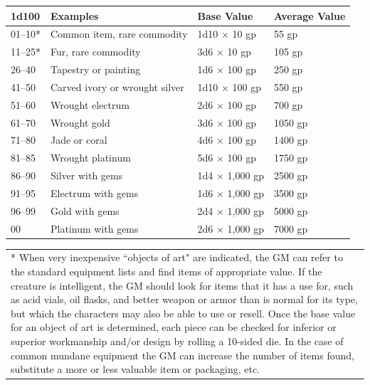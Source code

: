 \begin{multicols}{2}
\begin{minipage}{\columnwidth}
\label{artobjects}
\noindent
\begin{tabular}{|p{}|p{}|p{}|p{}|}
\hline
1d100	& Examples	& Base Value	& Average Value \\
\hline\hline
\rowcolor[gray]{.9}01--10*	& Common item, rare commodity	& 1d10 $\times$ 10 gp	& 55 gp \\
11--25*	& Fur, rare commodity	& 3d6 $\times$ 10 gp	& 105 gp \\
\rowcolor[gray]{.9}26--40	& Tapestry or painting	& 1d6 $\times$ 100 gp	& 250 gp \\
41--50	& Carved ivory or wrought silver	& 1d10 $\times$ 100 gp	& 550 gp \\
\rowcolor[gray]{.9}51--60	& Wrought electrum	& 2d6 $\times$ 100 gp	& 700 gp \\
61--70	& Wrought gold	& 3d6 $\times$ 100 gp	& 1050 gp \\
\rowcolor[gray]{.9}71--80	& Jade or coral	& 4d6 $\times$ 100 gp	& 1400 gp \\
81--85	& Wrought platinum	& 5d6 $\times$ 100 gp	& 1750 gp \\
\rowcolor[gray]{.9}86--90	& Silver with gems	& 1d4 $\times$ 1,000 gp	& 2500 gp \\
91--95	& Electrum with gems	& 1d6 $\times$ 1,000 gp	& 3500 gp \\
\rowcolor[gray]{.9}96--99	& Gold with gems	& 2d4 $\times$ 1,000 gp	& 5000 gp \\
00	& Platinum with gems	& 2d6 $\times$ 1,000 gp	& 7000 gp \\
\hline
\end{tabular}
\noindent\begin{tabular}{p{}}
* When very inexpensive ``objects of art" are indicated, the GM can refer to the standard equipment lists and find items of appropriate value.  If the creature is intelligent, the GM should look for items that it has a use for, such as acid vials, oil flasks, and better weapon or armor than is normal for its type, but which the characters may also be able to use or resell.   Once the base value for an object of art is determined, each piece can be checked for inferior or superior workmanship and/or design by rolling a 10-sided die.  In the case of common mundane equipment the GM can increase the number of items found, substitute a more or less valuable item or packaging, etc. \\
\end{tabular}\vspace{.5em}


\end{minipage}
\end{multicols}

